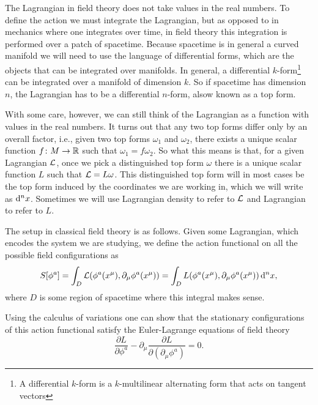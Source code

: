 \documentclass[../main.tex]{subfiles}
\begin{document}
The Lagrangian in field theory does not take values in the real numbers. To define the
action we must integrate the Lagrangian, but as opposed to in mechanics where one
integrates over time, in field theory this integration is performed over a patch of
spacetime. Because spacetime is in general a curved manifold we will need to use the
language of differential forms, which are the objects that can be integrated over
manifolds. In general, a differential \( k \)-form\footnote{A differential \( k \)-form is
a \( k \)-multilinear alternating form that acts on tangent vectors} can be integrated
over a manifold of dimension \( k \). So if spacetime has dimension \( n \), the
Lagrangian has to be a differential \( n \)-form, alsow known as a top form. 

With some care, however, we can still think of the Lagrangian as a function with values
in the real numbers.  It turns out that any two top forms differ only by an overall
factor, i.e., given two top forms \( \omega_1 \) and \( \omega_2 \), there exists a unique
scalar function \( f \colon M \to \mathbb{R} \) such that \( \omega_1 =
f\omega_2 \). So what this means is that, for a given Lagrangian \( \mathcal{L} \), once we pick a
distinguished top form \( \omega \) there is a unique scalar function \( L \) such that \( \mathcal{L} = L
\omega \). This distinguished top form will in most cases be the top form induced by the
coordinates we are working in, which we will write as \( \mathrm{d}^nx \). Sometimes we will use
Lagrangian density to refer to \( \mathcal{L} \) and Lagrangian to refer to \( L \). 

The setup in classical field theory is as follows. Given some Lagrangian, which encodes
the system we are studying, we define the action functional on all the possible field
configurations as 
\begin{equation*}
	S[\phi^a] = \int_D \mathcal{L}(\phi^a(x^\mu), \partial_\mu \phi^a(x^\mu)) = \int_D
	L(\phi^a(x^\mu), \partial_\mu \phi^a(x^\mu)) \,\mathrm{d}^n x,
\end{equation*}
where \( D \) is some region of spacetime where this integral makes sense. 

Using the calculus of variations one can show that the stationary configurations of this
action functional satisfy the Euler-Lagrange equations of field theory
\begin{equation*}
	\frac{\partial L}{\partial \phi^a} - \partial_\mu \frac{\partial L}{\partial
	(\partial_\mu \phi ^a)} = 0. 
\end{equation*}
\end{document}
